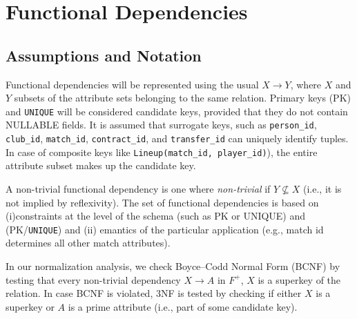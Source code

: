 \documentclass[12pt]{article}
\begin{document}
\section{Functional Dependencies}
\subsection{Assumptions and Notation}
Functional dependencies will be represented using the usual $X \rightarrow Y$, where $X$ and $Y$ subsets of the attribute sets belonging to the same relation. Primary keys (PK) and \texttt{UNIQUE} will be considered candidate keys, provided that they do not
contain NULLABLE fields. It is assumed that surrogate keys, such as \texttt{person\_id}, \texttt{club\_id}, \texttt{match\_id}, \texttt{contract\_id}, and \texttt{transfer\_id} can uniquely identify tuples. In case of composite keys like \texttt{Lineup(match\_id, player\_id)}), the entire attribute subset makes up the candidate key.

A non-trivial functional dependency is one where \emph{non-trivial} if $Y \nsubseteq X$ (i.e., it is not implied by reflexivity). The set of functional dependencies is based on (i)constraints at the level of
the schema (such as PK or UNIQUE) and (PK/\texttt{UNIQUE}) and (ii) emantics of the particular application (e.g., match id determines all other match attributes).

In our normalization analysis, we check Boyce--Codd Normal Form (BCNF) by testing that every non-trivial dependency $X \rightarrow A$ in $F^{+}$, $X$ is a superkey of the relation. In case BCNF is violated, 3NF is tested by checking if either $X$ is a superkey or $A$ is a prime attribute (i.e., part of some candidate key).
\end{document}
